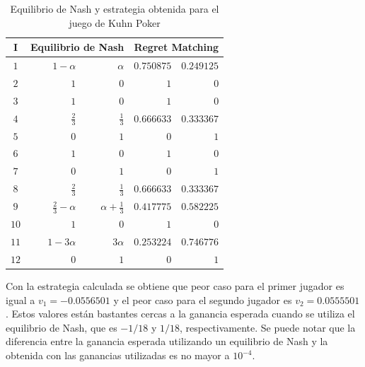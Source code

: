 \begin{table}[ht]
    \centering
    \begin{tabular}{c|r r| r r}
        I & \multicolumn{2}{|c|}{Equilibrio de Nash} & \multicolumn{2}{|c}{Regret Matching} \\ \hline
         $1$ & $1-\alpha$ & $\alpha$ & $0.750875$ & $0.249125$ \\
         $2$ & $1$ & $0$ & $1$ & $0$ \\
         $3$ & $1$ & $0$ & $1$ & $0$ \\
         $4$ & $\frac{2}{3}$& $\frac{1}{3}$ & $0.666633$ & $0.333367$ \\
         $5$ & $0$ & $1$ & $0$ & $1$ \\
         $6$ & $1$ & $0$ & $1$ & $0$ \\
         $7$ & $0$ & $1$ & $0$ & $1$ \\
         $8$ & $\frac{2}{3}$ & $\frac{1}{3}$ & $0.666633$ & $0.333367$ \\
         $9$ & $\frac{2}{3} - \alpha$ & $\alpha + \frac{1}{3}$ & $0.417775$ & $0.582225$ \\
        $10$ & $1$ & $0$ & $1$ & $0$ \\
        $11$ & $1 - 3 \alpha$ & $3 \alpha$ & $0.253224$ & $0.746776$ \\
        $12$ & $0$ & $1$ & $0$ & $1$ \\ \hline
    \end{tabular}
    \caption{Equilibrio de Nash y estrategia obtenida para el juego de Kuhn Poker}
    \label{tab:estrategia-kuhn-poker}
\end{table}

Con la estrategia calculada se obtiene que peor caso para el primer jugador es igual a $v_1 = -0.0556501$ y el peor caso para el segundo jugador es $v_2 = 0.0555501$. Estos valores están bastantes cercas a la ganancia esperada cuando se utiliza el equilibrio de Nash, que es $-1/18$ y $1/18$, respectivamente. Se puede notar que la diferencia entre la ganancia esperada utilizando un equilibrio de Nash y la obtenida con las ganancias utilizadas es no mayor a $10 ^ {-4}$.
